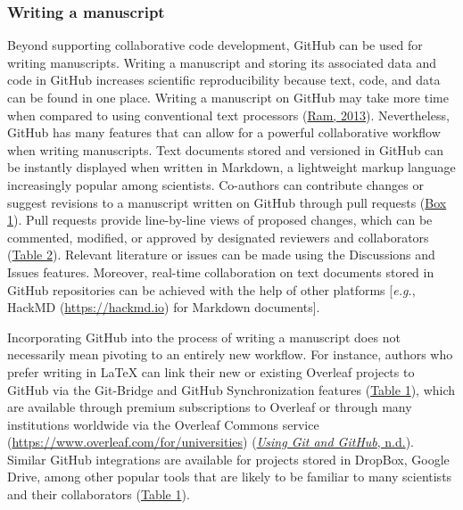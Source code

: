 \hypertarget{writing-a-manuscript}{%
\subsubsection{Writing a manuscript}\label{writing-a-manuscript}}

Beyond supporting collaborative code development, GitHub can be used for writing manuscripts.
Writing a manuscript and storing its associated data and code in GitHub increases scientific reproducibility because text, code, and data can be found in one place.
Writing a manuscript on GitHub may take more time when compared to using conventional text processors (\protect\hyperlink{ref-4ny1onB0}{Ram, 2013}).
Nevertheless, GitHub has many features that can allow for a powerful collaborative workflow when writing manuscripts.
Text documents stored and versioned in GitHub can be instantly displayed when written in Markdown, a lightweight markup language increasingly popular among scientists. Co-authors can contribute changes or suggest revisions to a manuscript written on GitHub through pull requests (\protect\hyperlink{definitions}{Box 1}).
Pull requests provide line-by-line views of proposed changes, which can be commented, modified, or approved by designated reviewers and collaborators (\protect\hyperlink{tbl:roles}{Table 2}).
Relevant literature or issues can be made using the Discussions and Issues features.
Moreover, real-time collaboration on text documents stored in GitHub repositories can be achieved with the help of other platforms {[}\emph{e.g.}, HackMD (\url{https://hackmd.io}) for Markdown documents{]}.

Incorporating GitHub into the process of writing a manuscript does not necessarily mean pivoting to an entirely new workflow.
For instance, authors who prefer writing in LaTeX can link their new or existing Overleaf projects to GitHub via the Git-Bridge and GitHub Synchronization features (\protect\hyperlink{tbl:compare}{Table 1}), which are available through premium subscriptions to Overleaf or through many institutions worldwide via the Overleaf Commons service (\url{https://www.overleaf.com/for/universities}) (\protect\hyperlink{ref-oGbKxHzj}{\emph{Using Git and GitHub}, n.d.}).
Similar GitHub integrations are available for projects stored in DropBox, Google Drive, among other popular tools that are likely to be familiar to many scientists and their collaborators (\protect\hyperlink{tbl:compare}{Table 1}).

